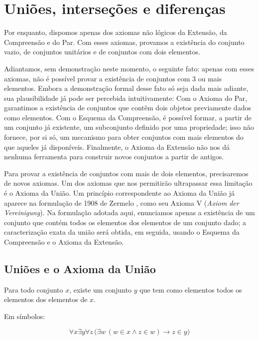 \section{Uniões, interseções e diferenças}\label{sec:unioesIntersecoesEDiferencas}
Por enquanto, dispomos apenas dos axiomas não lógicos da Extensão, da Compreensão e do Par.
Com esses axiomas, provamos a existência do conjunto vazio, de conjuntos unitários e de conjuntos com dois elementos.

Adiantamos, sem demonstração neste momento, o seguinte fato: apenas com esses axiomas, não é possível provar a existência de conjuntos com $3$ ou mais elementos.
Embora a demonstração formal desse fato só seja dada mais adiante, sua plausibilidade já pode ser percebida intuitivamente:
Com o Axioma do Par, garantimos a existência de conjuntos que contêm dois objetos previamente dados como elementos.
Com o Esquema da Compreensão, é possível formar, a partir de um conjunto já existente, um subconjunto definido por uma propriedade; isso não fornece, por si só, um mecanismo para obter conjuntos com mais elementos do que aqueles já disponíveis.
Finalmente, o Axioma da Extensão não nos dá nenhuma ferramenta para construir novos conjuntos a partir de antigos.

Para provar a existência de conjuntos com mais de dois elementos, precisaremos de novos axiomas.
Um dos axiomas que nos permitirão ultrapassar essa limitação é o Axioma da União.
Um princípio correspondente ao Axioma da União já aparece na formulação de 1908 de Zermelo
\cite{zermelo1908untersuchungen}, como seu Axioma V
(\emph{Axiom der Vereinigung}).
Na formulação adotada aqui, enunciamos apenas a
existência de um conjunto que contém todos os elementos dos elementos de um conjunto dado;
a caracterização exata da união será obtida, em seguida, usando o Esquema da Compreensão
e o Axioma da Extensão.

\subsection{Uniões e o Axioma da União}\label{subsec:unioesEAxiomaDaUniao}
\begin{axiom}\label{ax:uniao}
    Para todo conjunto $x$, existe um conjunto $y$ que tem como elementos todos os elementos dos elementos de $x$.

    Em símbolos:

    \[
    \forall x \exists y \forall z\, \bigl(\exists w\, (w \in x \land z \in w) \rightarrow z \in y\bigr)
    \]
\end{axiom}

